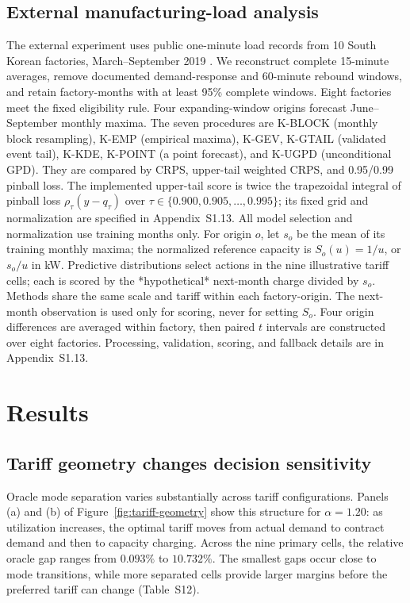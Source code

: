\documentclass[suppldata]{interact}
\begin{document}
\subsection{External manufacturing-load analysis}
\label{sec:external-manufacturing}
The external experiment uses public one-minute load records from
10 South Korean factories, March--September 2019
\citep{Lee2022KoreanFactories,LeeFigshareV9}. We reconstruct complete
15-minute averages, remove documented demand-response and 60-minute
rebound windows, and retain factory-months with at least 95\%
complete windows. Eight factories meet the fixed eligibility rule.
Four expanding-window origins forecast June--September monthly maxima.
The seven procedures are K-BLOCK (monthly block resampling), K-EMP
(empirical maxima), K-GEV, K-GTAIL (validated event tail), K-KDE,
K-POINT (a point forecast), and K-UGPD (unconditional GPD).
They are compared by CRPS, upper-tail weighted CRPS, and 0.95/0.99
pinball loss. The implemented upper-tail score is twice the trapezoidal
integral of pinball loss $\rho_\tau(y-q_\tau)$ over
$\tau\in\{0.900,0.905,\ldots,0.995\}$; its fixed grid and
normalization are specified in Appendix~S1.13. All model selection
and normalization use training
months only. For origin $o$, let $s_o$ be the mean of its training
monthly maxima; the normalized reference capacity is $S_o(u)=1/u$,
or $s_o/u$ in kW. Predictive distributions select actions in the
nine illustrative tariff cells; each is scored by the *hypothetical*
next-month charge divided by $s_o$. Methods share the same scale and
tariff within each factory-origin. The next-month observation is used
only for scoring, never for setting $S_o$.
Four origin differences are averaged within factory, then paired
$t$ intervals are constructed over eight factories. Processing,
validation, scoring, and fallback details are in Appendix~S1.13.

\section{Results}
\label{sec:results}

\subsection{Tariff geometry changes decision sensitivity}
\label{sec:results-geometry}

Oracle mode separation varies substantially across tariff
configurations. Panels (a) and (b) of
Figure~\ref{fig:tariff-geometry} show this structure for
$\alpha=1.20$: as utilization increases, the optimal tariff moves
from actual demand to contract demand and then to capacity charging. Across the nine primary cells, the relative oracle gap ranges
from $0.093\%$ to $10.732\%$. The smallest gaps occur close to
mode transitions, while more separated cells provide larger margins
before the preferred tariff can change (Table~S12).
\end{document}
